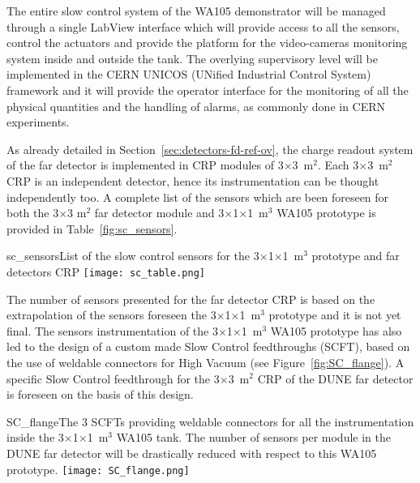 The entire slow control system of the WA105 demonstrator will be
managed through a single LabView interface which will provide access
to all the sensors, control the actuators and provide the platform for
the video-cameras monitoring system inside and outside the tank. The
overlying supervisory level will be implemented in the CERN UNICOS
(UNified Industrial Control System) framework\cite{unicos} and it
will provide the operator interface for the monitoring of all the
physical quantities and the handling of alarms, as commonly done in
CERN experiments.

As already detailed in Section~\ref{sec:detectors-fd-ref-ov}, the
charge readout system of the far detector is implemented in CRP
modules of 3$\times$3~m$^2$. Each 3$\times$3~m$^2$ CRP is an
independent detector, hence its instrumentation can be thought
independently too. A complete list of the sensors which are been
foreseen for both the 3$\times$3 m$^2$ far detector module and
3$\times$1$\times$1~m$^3$ WA105 prototype is provided in
Table~\ref{fig:sc_sensors}. 
\begin{cdrfigure}{sc_sensors}{List of the slow control sensors for the 3$\times$1$\times$1~m$^3$ prototype and far detectors CRP}
 \texttt{[image: sc\_table.png]} %
 \end{cdrfigure}
The number of sensors presented for the
far detector CRP is based on the extrapolation of the sensors foreseen
the 3$\times$1$\times$1~m$^3$ prototype and it is not yet final.
The sensors instrumentation of the 3$\times$1$\times$1~m$^3$ WA105
prototype has also led to the design of a custom made Slow Control
feedthroughs (SCFT), based on the use of weldable connectors for High
Vacuum (see Figure~\ref{fig:SC_flange}). A specific Slow Control
feedthrough for the 3$\times$3~m$^2$ CRP of the DUNE far detector is
foreseen on the basis of this design.
\begin{cdrfigure}{SC_flange}{The 3 SCFTs providing 
weldable connectors for all the instrumentation inside the 3$\times$1$\times$1~m$^3$  WA105 tank. 
The number of sensors per module in the DUNE far detector will be drastically 
reduced with respect to this WA105 prototype.}
  \texttt{[image: SC\_flange.png]}
 \end{cdrfigure}

